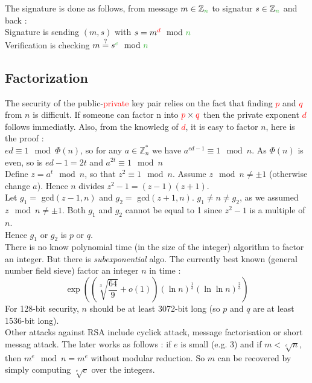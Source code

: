 \documentclass[11pt,a4paper]{report}
\begin{document}
The signature is done as follows, from message $m \in \mathbb{Z}_{\textcolor{ao}{n}}$ to signatur $s \in \mathbb{Z}_{\textcolor{ao}{n}}$ and back :\\
Signature is sending $(m,s)$ with $s = m^{\textcolor{red}{d}} \mod \textcolor{ao}{n}$\\
Verification is checking $m \stackrel{?}{=} s^{\textcolor{ao}{e}} \mod \textcolor{ao}{n}$

\subsection{Factorization}
The security of the \textcolor{ao}{public}-\textcolor{red}{private} key pair relies on the fact that finding \textcolor{red}{$p$} and \textcolor{red}{$q$} from \textcolor{ao}{$n$} is difficult. If someone can factor \textcolor{ao}{n} into $\textcolor{red}{p} \times \textcolor{red}{q}$ then the private exponent \textcolor{red}{$d$} follows immediatly. Also, from the knowledg of \textcolor{red}{$d$}, it is easy to factor \textcolor{ao}{$n$}, here is the proof :\\
$ed \equiv 1 \mod \Phi(n)$, so for any $a \in \mathbb{Z}_n^*$ we have $a^{ed-1} \equiv 1 \mod n$. As $\Phi(n)$ is even, so is $ed-1 = 2t$ and $a^{2t} \equiv 1 \mod n$\\
Define $z = a^t \mod n$, so that $z^2 \equiv 1 \mod n$. Assume $z \mod n \neq \pm 1$ (otherwise change $a$). Hence $n$ divides $z^2 - 1 = (z-1)(z+1)$.\\
Let $g_1 =$ gcd$(z-1,n)$ and $g_2 =$ gcd$(z + 1,n)$. $g_1 \neq n \neq g_2$, as we assumed $z \mod n \neq \pm 1$. Both $g_1$ and $g_2$ cannot be equal to 1 since $z^2 - 1$ is a multiple of $n$.\\
Hence $g_1$ or $g_2$ is $p$ or $q$.\\

There is no know polynomial time (in the size of the integer) algorithm to factor an integer. But there is \emph{subexponential} algo. The currently best known (general number field sieve) factor an integer $n$ in time :
$$\exp \left( \left( \sqrt[3]{\frac{64}{9}} + o(1) \right) (\ln n)^{\frac{1}{3}} (\ln \ln n)^{\frac{2}{3}} \right)$$
For 128-bit security, $n$ should be at least 3072-bit long (so $p$ and $q$ are at least 1536-bit long).\\

Other attacks against RSA include cyclick attack, message factorisation or short messag attack. The later works as follows : if $e$ is small (e.g. 3) and if $m < \sqrt[e]{n}$, then $m^e \mod n = m^e$ without modular reduction. So $m$ can be recovered by simply computing $\sqrt[e]{c}$ over the integers.
\end{document}

